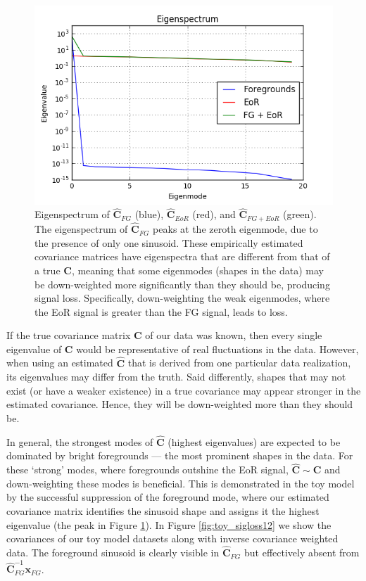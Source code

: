 \documentclass[preprint2,numberedappendix,tighten]{aastex6}  %
\begin{document}
\begin{figure}
	\centering
	\includegraphics[trim={0.3cm 0.2cm 0.3cm 0.3cm},clip,width=\columnwidth]{plots/toy_sigloss2.png}
	\caption{Eigenspectrum of $\hat{\textbf{C}}_{FG}$ (blue), $\hat{\textbf{C}}_{EoR}$ (red), and $\hat{\textbf{C}}_{FG+EoR}$ (green). The eigenspectrum of $\hat{\textbf{C}}_{FG}$ peaks at the zeroth eigenmode, due to the presence of only one sinusoid. These empirically estimated covariance matrices have eigenspectra that are different from that of a true $\textbf{C}$, meaning that some eigenmodes (shapes in the data) may be down-weighted more significantly than they should be, producing signal loss. Specifically, down-weighting the weak eigenmodes, where the EoR signal is greater than the FG signal, leads to loss.}
	\label{fig:toy_sigloss2}
\end{figure}

If the true covariance matrix $\textbf{C}$ of our data was known, then every single eigenvalue of $\textbf{C}$ would be representative of real fluctuations in the data. However, when using an estimated $\hat{\textbf{C}}$ that is derived from one particular data realization, its eigenvalues may differ from the truth. Said differently, shapes that may not exist (or have a weaker existence) in a true covariance may appear stronger in the estimated covariance. Hence, they will be down-weighted more than they should be.

In general, the strongest modes of $\hat{\textbf{C}}$ (highest eigenvalues) are expected to be dominated by bright foregrounds --- the most prominent shapes in the data. For these `strong' modes, where foregrounds outshine the EoR signal, $\hat{\textbf{C}} \sim \textbf{C}$ and down-weighting these modes is beneficial. This is demonstrated in the toy model by the successful suppression of the foreground mode, where our estimated covariance matrix identifies the sinusoid shape and assigns it the highest eigenvalue (the peak in Figure \ref{fig:toy_sigloss2}). In Figure \ref{fig:toy_sigloss12} we show the covariances of our toy model datasets along with inverse covariance weighted data. The foreground sinusoid is clearly visible in $\hat{\textbf{C}}_{FG}$ but effectively absent from $\hat{\textbf{C}}^{-1}_{FG}\textbf{x}_{FG}$.
\end{document}
